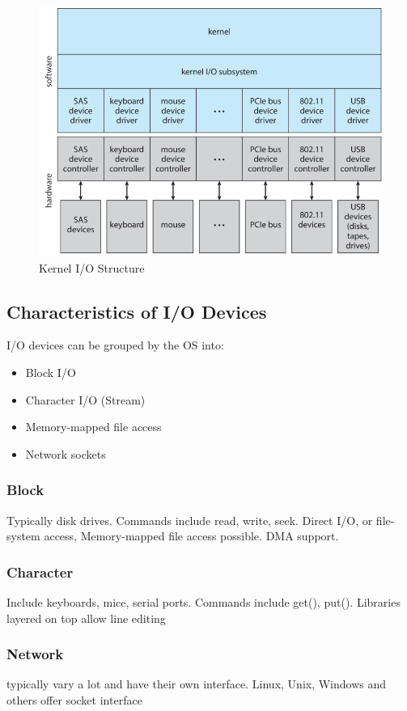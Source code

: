 \begin{figure}[h!]
    \centering
    \includegraphics[width=0.55\linewidth]{img/h,mj,ghn.png}
    \caption{Kernel I/O Structure}
\end{figure}

\newpage
\subsection{Characteristics of I/O Devices}

I/O devices can be grouped by the OS into:

\begin{itemize}
    \item Block I/O
    \item Character I/O (Stream)
    \item Memory-mapped file access
    \item Network sockets
\end{itemize}

\subsubsection{Block}

Typically disk drives. Commands include read, write, seek. Direct I/O, or file-system access, Memory-mapped file access possible. DMA support.

\subsubsection{Character}

Include keyboards, mice, serial ports. Commands include get(), put(). Libraries layered on top allow line editing

\subsubsection{Network}
typically vary a lot and have their own interface. Linux, Unix, Windows and others offer socket interface


